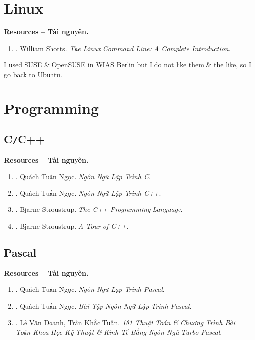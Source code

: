 \documentclass{article}
\begin{document}
\section{Linux}
\textbf{\textsf{Resources -- Tài nguyên.}}
\begin{enumerate}
	\item \cite{Shotts2019}. {\sc William Shotts}. {\it The Linux Command Line: A Complete Introduction}.
\end{enumerate}
I used SUSE \& OpenSUSE in WIAS Berlin but I do not like them \& the like, so I go back to Ubuntu.


\section{Programming}

\subsection{C{\tt/}C++}
\textbf{\textsf{Resources -- Tài nguyên.}}
\begin{enumerate}
	\item \cite{Ngoc_C}. {\sc Quách Tuấn Ngọc}. {\it Ngôn Ngữ Lập Trình C}.
	\item \cite{Ngoc_C++}. {\sc Quách Tuấn Ngọc}. {\it Ngôn Ngữ Lập Trình C++}.
	\item \cite{Stroustrup2013}. {\sc Bjarne Stroustrup}. {\it The C++ Programming Language}.
	\item \cite{Stroustrup2018}. {\sc Bjarne Stroustrup}. {\it A Tour of C++}.
\end{enumerate}

\subsection{Pascal}
\textbf{\textsf{Resources -- Tài nguyên.}}
\begin{enumerate}
	\item \cite{Ngoc_Pascal}. {\sc Quách Tuấn Ngọc}. {\it Ngôn Ngữ Lập Trình Pascal}.
	\item \cite{Ngoc_BT_Pascal}. {\sc Quách Tuấn Ngọc}. {\it Bài Tập Ngôn Ngữ Lập Trình Pascal}.
	\item \cite{Doanh_Tuan_Pascal}. {\sc Lê Văn Doanh, Trần Khắc Tuấn}. {\it101 Thuật Toán \& Chương Trình Bài Toán Khoa Học Kỹ Thuật \& Kinh Tế Bằng Ngôn Ngữ Turbo-Pascal}.
\end{enumerate}
\end{document}
